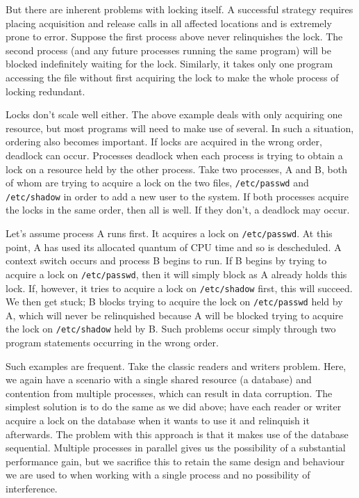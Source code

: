 But there are inherent problems with locking itself.  A successful
strategy requires placing acquisition and release calls in all
affected locations and is extremely prone to error.  Suppose the first
process above never relinquishes the lock.  The second process (and
any future processes running the same program) will be blocked
indefinitely waiting for the lock.  Similarly, it takes only one
program accessing the file without first acquiring the lock to make
the whole process of locking redundant.

Locks don't scale well either.  The above example deals with only
acquiring one resource, but most programs will need to make use of
several.  In such a situation, ordering also becomes important.  If
locks are acquired in the wrong order, deadlock can occur.  Processes
deadlock when each process is trying to obtain a lock on a resource
held by the other process.  Take two processes, A and B, both of whom
are trying to acquire a lock on the two files, \texttt{/etc/passwd}
and \texttt{/etc/shadow} in order to add a new user to the system.  If
both processes acquire the locks in the same order, then all is well.
If they don't, a deadlock may occur.

Let's assume process A runs first.  It acquires a lock on
\texttt{/etc/passwd}.  At this point, A has used its allocated quantum
of CPU time and so is descheduled.  A context switch occurs and
process B begins to run.  If B begins by trying to acquire a lock on
\texttt{/etc/passwd}, then it will simply block as A already holds
this lock.  If, however, it tries to acquire a lock on
\texttt{/etc/shadow} first, this will succeed.  We then get stuck; B
blocks trying to acquire the lock on \texttt{/etc/passwd} held by A,
which will never be relinquished because A will be blocked trying to
acquire the lock on \texttt{/etc/shadow} held by B.  Such problems
occur simply through two program statements occurring in the wrong
order.

Such examples are frequent.  Take the classic readers and writers
problem.  Here, we again have a scenario with a single shared resource
(a database) and contention from multiple processes, which can result
in data corruption.  The simplest solution is to do the same as we did
above; have each reader or writer acquire a lock on the database when
it wants to use it and relinquish it afterwards.  The problem with
this approach is that it makes use of the database sequential.
Multiple processes in parallel gives us the possibility of a
substantial performance gain, but we sacrifice this to retain the same
design and behaviour we are used to when working with a single process
and no possibility of interference.

